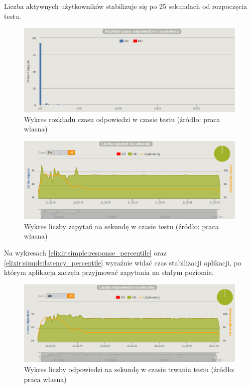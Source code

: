 \documentclass[12pt,twoside]{article}
\begin{document}
Liczba aktywnych użytkowników stabilizuje się po 25 sekundach od
rozpoczęcia testu.

\begin{figure}[htbp]
\centering
\includegraphics[resolution=150]{test_results/elixir/simpletest/screenshots/distribution.png}
\caption{Wykres rozkładu czasu odpowiedzi w czasie testu (źródło: praca własna)}
\end{figure}

\begin{figure}[htbp]
\centering
\includegraphics[resolution=150]{test_results/elixir/simpletest/screenshots/requests.png}
\caption{Wykres liczby zapytań na sekundę w czasie testu (źródło: praca własna)}
\end{figure}

Na wykresach \ref{elixir:simple:response_percentile} oraz
\ref{elixir:simple:latency_percentile} wyraźnie widać czas stabilizacji
aplikacji, po którym aplikacja zaczęła przyjmować zapytania na stałym
poziomie.

\begin{figure}[htbp]
\centering
\includegraphics[resolution=150]{test_results/elixir/simpletest/screenshots/responses.png}
\caption{Wykres liczby odpowiedzi na sekundę w czasie trwania testu (źródło: praca własna)}
\end{figure}
\end{document}
